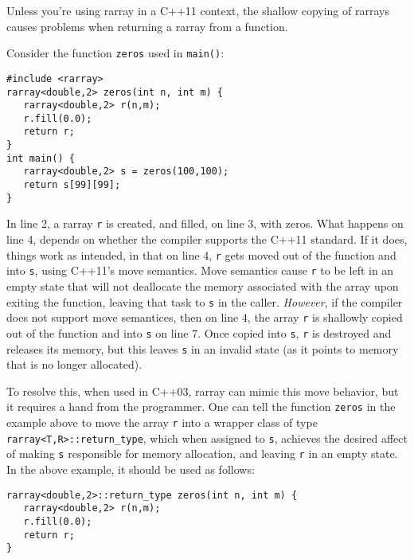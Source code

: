 \documentclass[11pt,twoside]{article}
\begin{document}
Unless you're using rarray in a C++11 context, the shallow copying of
rarrays causes problems when returning a rarray from a function.

Consider the function \texttt{zeros} used in \texttt{main()}:
\vspace{-9pt}
\begin{framed}\vspace{-12pt}%
\begin{verbatim}
#include <rarray>
rarray<double,2> zeros(int n, int m) {
   rarray<double,2> r(n,m);
   r.fill(0.0);
   return r;
}
int main() {
   rarray<double,2> s = zeros(100,100);
   return s[99][99];
}
\end{verbatim}%
\vspace{-12pt}
\end{framed}\vspace{-8pt}
In line 2, a rarray \texttt{r} is created, and filled, on line 3, with zeros.
What happens on line 4, depends on whether the compiler supports the
C++11 standard. If it does, things work as intended, in that on line 4, \texttt{r} gets moved out of
the function and into \texttt{s}, using C++11's move
semantics. Move semantics cause \texttt{r} to be left in an empty state
that will not deallocate the memory associated with the array upon
exiting the function, leaving that task to \texttt{s} in the caller. \emph{However}, if the compiler does not support move semantices,
then on line 4, the array \texttt{r} is shallowly copied out of the
function and into \texttt{s} on line 7. Once copied into \texttt{s}, \texttt{r} is destroyed and releases its
memory, but this leaves \texttt{s} in an invalid state (as it points to
memory that is no longer allocated).

To resolve this, when used in C++03, rarray can mimic this move
behavior, but it requires a hand from the programmer.  One can tell
the function \texttt{zeros} in the example above to move the array
\texttt{r} into a wrapper class of type
\texttt{rarray<T,R>::return\_type}, which when assigned to \texttt{s},
achieves the desired affect of making \texttt{s} responsible for
memory allocation, and leaving \texttt{r} in an empty state. In the above
example, it should be used as follows:
\vspace{-9pt}
\begin{framed}\vspace{-12pt}%
\begin{verbatim}
rarray<double,2>::return_type zeros(int n, int m) {
   rarray<double,2> r(n,m);
   r.fill(0.0);
   return r;
}
\end{verbatim}%
\vspace{-12pt}
\end{framed}\vspace{-8pt}
\end{document}
